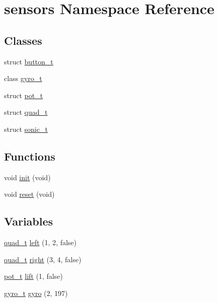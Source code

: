 \hypertarget{namespacesensors}{}\section{sensors Namespace Reference}
\label{namespacesensors}
\subsection*{Classes}
\begin{DoxyCompactItemize}
\item 
struct \hyperlink{structsensors_1_1button__t}{button\+\_\+t}
\item 
class \hyperlink{classsensors_1_1gyro__t}{gyro\+\_\+t}
\item 
struct \hyperlink{structsensors_1_1pot__t}{pot\+\_\+t}
\item 
struct \hyperlink{structsensors_1_1quad__t}{quad\+\_\+t}
\item 
struct \hyperlink{structsensors_1_1sonic__t}{sonic\+\_\+t}
\end{DoxyCompactItemize}
\subsection*{Functions}
\begin{DoxyCompactItemize}
\item 
void \hyperlink{namespacesensors_a044693d89baff38c98f863ee503cde2e}{init} (void)
\item 
void \hyperlink{namespacesensors_a5d5bcadf00164a9db189d9bfa8d9dbb3}{reset} (void)
\end{DoxyCompactItemize}
\subsection*{Variables}
\begin{DoxyCompactItemize}
\item 
\hyperlink{structsensors_1_1quad__t}{quad\+\_\+t} \hyperlink{namespacesensors_ad7f873d16ad074c11f1e4c4f474be8ba}{left} (1, 2, false)
\item 
\hyperlink{structsensors_1_1quad__t}{quad\+\_\+t} \hyperlink{namespacesensors_a53537b79680b539c5312bab3bf7d2eb8}{right} (3, 4, false)
\item 
\hyperlink{structsensors_1_1pot__t}{pot\+\_\+t} \hyperlink{namespacesensors_aadc3d3ede9ae5dc9a3c25bf89a113268}{lift} (1, false)
\item 
\hyperlink{classsensors_1_1gyro__t}{gyro\+\_\+t} \hyperlink{namespacesensors_a76c3057efa993dfa91cf8870ea7c99e0}{gyro} (2, 197)
\end{DoxyCompactItemize}


